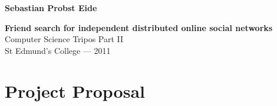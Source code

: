 \documentclass[12pt,twoside,notitlepage]{report}
\begin{document}



\makeatletter
\renewcommand{\@makechapterhead}[1]{%
\vspace*{50 pt}%
{\setlength{\parindent}{0pt} \raggedright \normalfont
\bfseries\Huge\thechapter.\ #1
\par\nobreak\vspace{40 pt}}}
\makeatother


\pagestyle{empty}

\hfill{\small \bf Sebastian Probst Eide}

\vspace*{60mm}
\begin{center}
\Huge
{\bf Friend search for independent distributed online social networks} \\
\vspace*{5mm}
Computer Science Tripos Part II \\
\vspace*{5mm}
St Edmund's College --- 2011 \\
\vspace*{5mm}
\end{center}

\cleardoublepage

\setcounter{page}{1}
\pagestyle{plain}





\setcounter{page}{1}
\pagestyle{headings}









\appendix
{}


\cleardoublepage
\chapter{Project Proposal}

\end{document}
